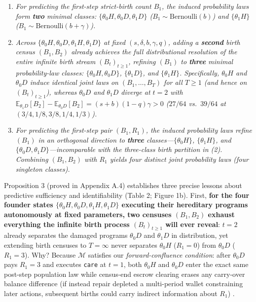 \documentclass[11pt,a4paper]{article}
\providecommand{\tightlist}{\setlength{\itemsep}{2pt}\setlength{\parskip}{0pt}}
\begin{document}
\begin{enumerate}
\def\labelenumi{\arabic{enumi}.}
\tightlist
\item
  \emph{For predicting the first-step strict-birth count \(B_1\), the
  induced probability laws form \textbf{two} minimal classes:
  \(\{\theta_0 H, \theta_0 D, \theta_1 D\}\)
  (\(B_1 \sim \mathrm{Bernoulli}(b)\)) and \(\{\theta_1 H\}\)
  (\(B_1 \sim \mathrm{Bernoulli}(b+\gamma)\)).}
\item
  \emph{Across \(\{\theta_0 H, \theta_0 D, \theta_1 H, \theta_1 D\}\) at
  fixed \((s,\delta,b,\gamma,q)\), adding a \textbf{second} birth census
  \((B_1, B_2)\) already achieves the full distributional resolution of
  the entire infinite birth stream \((B_t)_{t \ge 1}\), refining
  \((B_1)\) to \textbf{three} minimal probability-law classes:
  \(\{\theta_0 H, \theta_0 D\}\), \(\{\theta_1 D\}\), and
  \(\{\theta_1 H\}\). Specifically, \(\theta_0 H\) and \(\theta_0 D\)
  induce identical joint laws on \((B_1, \dots, B_T)\) for all
  \(T \ge 1\) (and hence on \((B_t)_{t \ge 1}\)), whereas \(\theta_0 D\)
  and \(\theta_1 D\) diverge at \(t=2\) with
  \(\mathbb{E}_{\theta_1 D}[B_2] - \mathbb{E}_{\theta_0 D}[B_2] = (s+b)(1-q)\gamma > 0\)
  (\(27/64\) vs.~\(39/64\) at \((3/4, 1/8, 3/8, 1/4, 1/3)\)).}
\item
  \emph{For predicting the first-step pair \((B_1, R_1)\), the induced
  probability laws refine \((B_1)\) in an orthogonal direction to
  \textbf{three} classes---\(\{\theta_0 H\}\), \(\{\theta_1 H\}\), and
  \(\{\theta_0 D, \theta_1 D\}\)---incomparable with the three-class
  birth partition in (2). Combining \((B_1, B_2)\) with \(R_1\) yields
  four distinct joint probability laws (four singleton classes).}
\end{enumerate}

Proposition 3 (proved in Appendix A.4) establishes three precise lessons
about predictive sufficiency and identifiability (Table 2; Figure 1b).
First, \textbf{for the four founder states
\(\{\theta_0 H, \theta_0 D, \theta_1 H, \theta_1 D\}\) executing their
hereditary programs autonomously at fixed parameters, two censuses
\((B_1, B_2)\) exhaust everything the infinite birth process
\((B_t)_{t \ge 1}\) will ever reveal}: \(t=2\) already separates the
damaged programs \(\theta_0 D\) and \(\theta_1 D\) in distribution, yet
extending birth censuses to \(T = \infty\) never separates
\(\theta_0 H\) (\(R_1 = 0\)) from \(\theta_0 D\) (\(R_1 = 3\)). Why?
Because \(\mathcal{M}\) satisfies our \emph{forward-confluence
condition}: after \(\theta_0 D\) pays \(R_1 = 3\) and executes
\texttt{care} at \(t=1\), both \(\theta_0 H\) and \(\theta_0 D\) enter
the exact same post-step population law while census-end escrow clearing
erases any carry-over balance difference (if instead repair depleted a
multi-period wallet constraining later actions, subsequent births could
carry indirect information about \(R_1\))
\citep{shaliziCrutchfield2001, dennett1991}.
\end{document}

